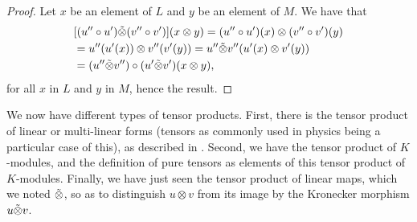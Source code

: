 \documentclass{report}
\theoremstyle{definition}
\theoremstyle{remark}
\begin{document}
\begin{proof}
    Let $x$ be an element of $L$ and $y$ be an element of $M$. 
    We have that
    \begin{equation*}
        \begin{split}
            & [(u'' \circ u')\Tilde{\otimes}(v'' \circ v')](x\otimes y) = (u'' \circ u')(x)\otimes (v'' \circ v')(y) \\
            & = u''(u'(x))\otimes v''(v'(y)) = u''\Tilde{\otimes} v'' (u'(x)\otimes v'(y)) \\
            & = (u''\Tilde{\otimes} v'')\circ(u' \Tilde{\otimes} v') (x\otimes y),
        \end{split}
    \end{equation*}
    for all $x$ in $L$ and $y$ in $M$, hence the result. 
\end{proof}

 


\bigskip
We now have different types of tensor products. First, there is the tensor product of linear or multi-linear forms (tensors as commonly used in physics being a particular case of this), as described in \cite{Godement}. Second, we have the tensor product of $K$-modules, and the definition of pure tensors as elements of this tensor product of $K$-modules. Finally, we have just seen the tensor product of linear maps, which we noted $\Tilde{\otimes}$, so as to distinguish $u\otimes v$ from its image by the Kronecker morphism $u \Tilde{\otimes} v$. 
\end{document}
